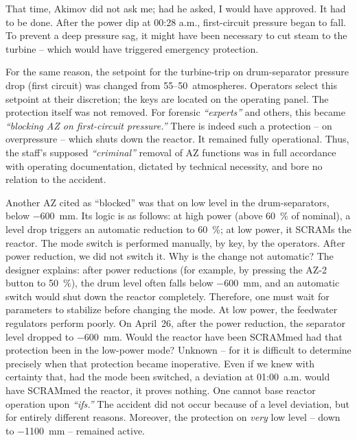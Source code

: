 \documentclass[openright]{bookest}
\begin{document}
That time, Akimov did not ask me; had he asked, I would have approved. It had to be done. After the power dip at 00:28 a.m., first-circuit pressure began to fall. To prevent a deep pressure sag, it might have been necessary to cut steam to the turbine -- which would have triggered emergency protection.

For the same reason, the setpoint for the turbine-trip on drum-separator pressure drop (first circuit) was changed from \numrange{55}{50}~atmospheres. Operators select this setpoint at their discretion; the keys are located on the operating panel. The protection itself was not removed. For forensic \textit{``experts''} and others, this became \textit{``blocking AZ on first-circuit pressure.''} There is indeed such a protection -- on overpressure -- which shuts down the reactor. It remained fully operational. Thus, the staff's supposed \textit{``criminal''} removal of AZ functions was in full accordance with operating documentation, dictated by technical necessity, and bore no relation to the accident.

Another AZ cited as ``blocked'' was that on low level in the drum-separators, below \qty{-600}{\milli\metre}. Its logic is as follows: at high power (above \qty{60}{\percent} of nominal), a level drop triggers an automatic reduction to \qty{60}{\percent}; at low power, it SCRAMs the reactor. The mode switch is performed manually, by key, by the operators. After power reduction, we did not switch it. Why is the change not automatic? The designer explains: after power reductions (for example, by pressing the AZ-2 button to \qty{50}{\percent}), the drum level often falls below \qty{-600}{\milli\metre}, and an automatic switch would shut down the reactor completely. Therefore, one must wait for parameters to stabilize before changing the mode. At low power, the feedwater regulators perform poorly. On April~26, after the power reduction, the separator level dropped to \qty{-600}{\milli\metre}. Would the reactor have been SCRAMmed had that protection been in the low-power mode? Unknown -- for it is difficult to determine precisely when that protection became inoperative. Even if we knew with certainty that, had the mode been switched, a deviation at 01:00~a.m. would have SCRAMmed the reactor, it proves nothing. One cannot base reactor operation upon \textit{``ifs.''} The accident did not occur because of a level deviation, but for entirely different reasons. Moreover, the protection on \textit{very} low level -- down to \qty{-1100}{\milli\metre} -- remained active.
\end{document}
